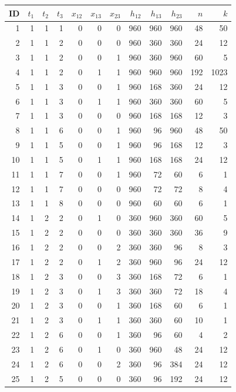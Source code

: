 \documentclass[11pt,a4paper]{article}
\begin{document}
\begin{longtable}{r|rrr|rrr|rrr|rr}\toprule
ID&$t_1$&$t_2$&$t_3$&$x_{12}$&$x_{13}$&$x_{23}$&$h_{12}$&$h_{13}$&$h_{23}$&$n$&$k$\\\midrule\endhead
1 & 1 & 1 & 1 & 0 & 0 & 0 & 960 & 960 & 960 & 48 & 50\\
2 & 1 & 1 & 2 & 0 & 0 & 0 & 960 & 360 & 360 & 24 & 12\\
3 & 1 & 1 & 2 & 0 & 0 & 1 & 960 & 360 & 960 & 60 & 5\\
4 & 1 & 1 & 2 & 0 & 1 & 1 & 960 & 960 & 960 & 192 & 1023\\
5 & 1 & 1 & 3 & 0 & 0 & 1 & 960 & 168 & 360 & 24 & 12\\
6 & 1 & 1 & 3 & 0 & 1 & 1 & 960 & 360 & 360 & 60 & 5\\
7 & 1 & 1 & 3 & 0 & 0 & 0 & 960 & 168 & 168 & 12 & 3\\
8 & 1 & 1 & 6 & 0 & 0 & 1 & 960 & 96 & 960 & 48 & 50\\
9 & 1 & 1 & 5 & 0 & 0 & 1 & 960 & 96 & 168 & 12 & 3\\
10 & 1 & 1 & 5 & 0 & 1 & 1 & 960 & 168 & 168 & 24 & 12\\
11 & 1 & 1 & 7 & 0 & 0 & 1 & 960 & 72 & 60 & 6 & 1\\
12 & 1 & 1 & 7 & 0 & 0 & 0 & 960 & 72 & 72 & 8 & 4\\
13 & 1 & 1 & 8 & 0 & 0 & 0 & 960 & 60 & 60 & 6 & 1\\
14 & 1 & 2 & 2 & 0 & 1 & 0 & 360 & 960 & 360 & 60 & 5\\
15 & 1 & 2 & 2 & 0 & 0 & 0 & 360 & 360 & 360 & 36 & 9\\
16 & 1 & 2 & 2 & 0 & 0 & 2 & 360 & 360 & 96 & 8 & 3\\
17 & 1 & 2 & 2 & 0 & 1 & 2 & 360 & 960 & 96 & 24 & 12\\
18 & 1 & 2 & 3 & 0 & 0 & 3 & 360 & 168 & 72 & 6 & 1\\
19 & 1 & 2 & 3 & 0 & 1 & 3 & 360 & 360 & 72 & 18 & 4\\
20 & 1 & 2 & 3 & 0 & 0 & 1 & 360 & 168 & 60 & 6 & 1\\
21 & 1 & 2 & 3 & 0 & 1 & 1 & 360 & 360 & 60 & 10 & 1\\
22 & 1 & 2 & 6 & 0 & 0 & 1 & 360 & 96 & 60 & 4 & 2\\
23 & 1 & 2 & 6 & 0 & 1 & 0 & 360 & 960 & 48 & 24 & 12\\
24 & 1 & 2 & 6 & 0 & 0 & 2 & 360 & 96 & 384 & 24 & 12\\
25 & 1 & 2 & 5 & 0 & 0 & 0 & 360 & 96 & 192 & 24 & 12\\

\end{longtable}
\end{document}
